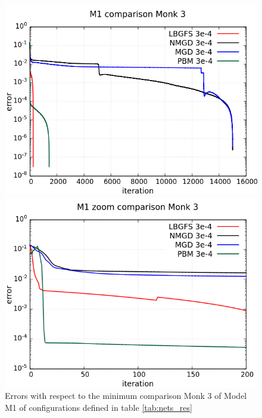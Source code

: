 \begin{figure}[H]
	\centering
	\begin{minipage}[t]{0.5\linewidth}
		\includegraphics[width=\linewidth]{data/Comparison/Monk3/Monk3_M1_error_standard.png}
	\end{minipage}%
	\begin{minipage}[t]{0.5\linewidth}
		\includegraphics[width=\linewidth]{data/Comparison/Monk3/Monk3_M1_error_zoom.png}
	\end{minipage}
	\caption{Errors with respect to the minimum comparison Monk 3 of Model M1 of configurations defined in table \ref{tab:nets_res}}
	\label{R-Monk3-M1}
\end{figure}

